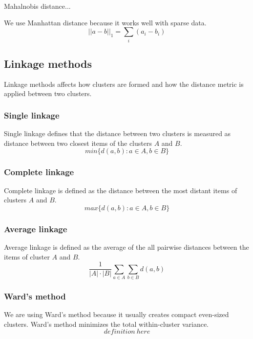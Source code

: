 Mahalnobis distance...

We use Manhattan distance because it works well with sparse data.
\cite{ref_here}
\begin{equation}
 ||a-b||_1 = \sum_i{(a_i-b_i)}
\end{equation}


\subsection{Linkage methods}


Linkage methods affects how clusters are formed and how the 
distance metric is applied between two clusters.

\subsubsection{Single linkage}
Single linkage defines that the distance between two clusters is 
measured as distance between two closest items of the clusters 
$A$ and $B$.
\begin{equation}
 min\{d(a,b):a \in A, b \in B\}
\end{equation}

\subsubsection{Complete linkage}
Complete linkage is defined as the distance between the most 
distant items of clusters $A$ and $B$.
\begin{equation}
 max\{d(a,b):a \in A, b \in B\}
\end{equation}

\subsubsection{Average linkage}
Average linkage is defined as the average of the all pairwise 
distances between the items of cluster $A$ and $B$.
\begin{equation}
 \frac{1}{|A| \cdot |B|} \sum_{a \in A} \sum_{b \in B}d(a,b)
\end{equation}

\subsubsection{Ward's method}
We are using Ward's method because it usually creates compact 
even-sized clusters. \cite{ref_here} Ward's method minimizes the 
total within-cluster variance.
\begin{equation}
 definition\ here
\end{equation}



